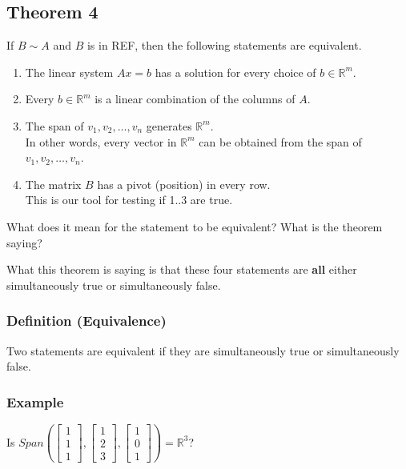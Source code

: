 \documentclass[12pt]{article}
\begin{document}
\subsection{Theorem 4}
If $B \sim A$ and $B$ is in REF, then the following statements are equivalent.

\begin{enumerate}
\item The linear system $Ax=b$ has a solution for every choice of $b\in\mathbb{R}^m$.
\item Every $b\in\mathbb{R}^m$ is a linear combination of the columns of $A$.
\item The span of $v_{1}, v_{2}, \dots, v_{n}$ generates $\mathbb{R}^m$.\\
  In other words, every vector in $\mathbb{R}^m$ can be obtained from the span
  of $v_{1}, v_{2}, \dots, v_{n}$.
\item The matrix $B$ has a pivot (position) in every row.\\
  This is our tool for testing if 1..3 are true.
\end{enumerate}

What does it mean for the statement to be equivalent? What is the theorem saying?

What this theorem is saying is that these four statements are \textbf{all} either
simultaneously true or simultaneously false.

\subsubsection{Definition (Equivalence)}

Two statements are equivalent if they are simultaneously true or simultaneously
false.

\subsubsection{Example}

Is $Span(
\begin{bmatrix}
  1 \\ 1 \\ 1
\end{bmatrix},
\begin{bmatrix}
  1 \\ 2 \\ 3
\end{bmatrix},
\begin{bmatrix}
  1 \\ 0 \\ 1
\end{bmatrix}
) = \mathbb{R}^3$?
\end{document}
